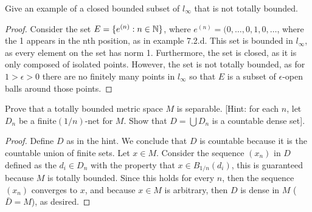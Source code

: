 \begin{exercise}{9}
Give an example of a closed bounded subset of $l_\infty$ that is not totally bounded.
\end{exercise}
\begin{proof}
Consider the set $E=\{e^{(n)}:n\in\mathbb{N}\}$, where $e^{(n)}=(0,\dots,0,1,0,\dots$, where the 1 appears in the nth position, as in example 7.2.d.
This set is bounded in $l_\infty$, as every element on the set has norm 1.
Furthermore, the set is closed, as it is only composed of isolated points.
However, the set is not totally bounded, as for $1>\epsilon>0$ there are no finitely many points in $l_\infty$ so that $E$ is a subset of $\epsilon$-open balls around those points.
\end{proof} 

\begin{exercise}{10}
Prove that a totally bounded metric space $M$ is separable.
[Hint: for each $n$, let $D_n$ be a finite$(1/n)$-net for $M$.
Show that $D=\bigcup D_n$ is a countable dense set].
\end{exercise}
\begin{proof}
Define $D$ as in the hint.
We conclude that $D$ is countable because it is the countable union of finite sets.
Let $x\in M$.
Consider the sequence $(x_n)$ in $D$ defined as the $d_i\in D_n$ with the property that $x\in B_{1/n}(d_i)$, this is guaranteed because $M$ is totally bounded.
Since this holds for every $n$, then the sequence $(x_n)$ converges to $x$, and because $x\in M$ is arbitrary, then $D$ is dense in $M$ ($\bar{D}=M$), as desired.
\end{proof} 
